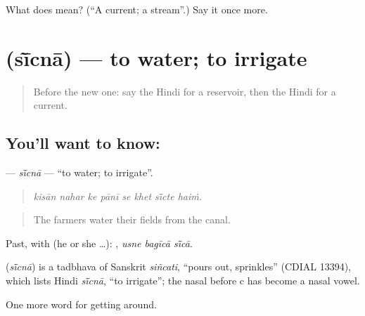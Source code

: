 \begin{tcolorbox}[breakable,colback=teal!4,colframe=teal!35!black,title={Before you move on}]
What does  mean? (\textquotedblleft{}A current; a stream\textquotedblright{}.) Say it once more.
\end{tcolorbox}
\section[\texorpdfstring{\hi{सींचना} (sī̃cnā)}{सींचना (sī̃cnā)}]{ (sī̃cnā) — to water; to irrigate}

\label{lesson:HI-C443-sicna}



\begin{quote}
Before the new one: say the Hindi for a reservoir, then the Hindi for a current.
\end{quote}

\subsection*{You'll want to know: }
\textbf{} — \emph{sī̃cnā} — \textquotedblleft{}to water; to irrigate\textquotedblright{}.

\begin{quote}
       
\end{quote}

\begin{quote}
\emph{kisān nahar ke pānī se khet sī̃cte haiṁ.}
\end{quote}

\begin{quote}
The farmers water their fields from the canal.
\end{quote}

Past, with  (he or she …):   , \emph{usne bagīcā sī̃cā}.

\begin{cousinweb}
\textbf{} (\emph{sī̃cnā}) is a tadbhava of Sanskrit \emph{siñcati}, \textquotedblleft{}pours out, sprinkles\textquotedblright{} (CDIAL 13394), which lists Hindi \emph{sī̃cnā}, \textquotedblleft{}to irrigate\textquotedblright{}; the nasal before c has become a nasal vowel.
\end{cousinweb}

\begin{grammarlens}[title={What you've built}]
One more word for getting around.
\end{grammarlens}

